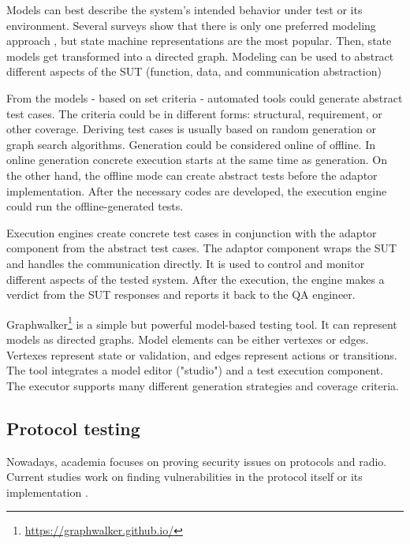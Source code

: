 Models can best describe the system's intended behavior under test or its environment. Several surveys show that there is only one preferred modeling approach \cite{10.1145/1353673.1353681, mbt-survey:2016, mbt-survey:2019}, but state machine representations are the most popular. Then, state models get transformed into a directed graph. Modeling can be used to abstract different aspects of the SUT (function, data, and communication abstraction)

From the models - based on set criteria - automated tools could generate abstract test cases. The criteria could be in different forms: structural, requirement, or other coverage. Deriving test cases is usually based on random generation or graph search algorithms. Generation could be considered online of offline. In online generation concrete execution starts at the same time as generation. On the other hand, the offline mode can create abstract tests before the adaptor implementation. After the necessary codes are developed, the execution engine could run the offline-generated tests.

Execution engines create concrete test cases in conjunction with the adaptor component from the abstract test cases. The adaptor component wraps the SUT and handles the communication directly. It is used to control and monitor different aspects of the tested system. After the execution, the engine makes a verdict from the SUT responses and reports it back to the QA engineer.

Graphwalker\footnote{\url{https://graphwalker.github.io/}} is a simple but powerful model-based testing tool. It can represent models as directed graphs. Model elements can be either vertexes or edges. Vertexes represent state or validation, and edges represent actions or transitions. The tool integrates a model editor ("studio") and a test execution component. The executor supports many different generation strategies and coverage criteria.

\subsection{Protocol testing}
Nowadays, academia focuses on proving security issues on protocols and radio. Current studies work on finding vulnerabilities in the protocol itself or its implementation \cite{10.1145/3576915.3623066, 10.1145/3448300.3468287, 10.1145/3448300.3468296, 10.1145/3548606.3560703, 10.1145/3098243.3098254, 10.1145/3597926.3598144, 10.1145/3507657.3528544}.

